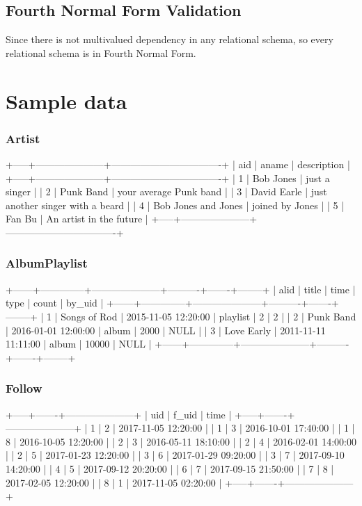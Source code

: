 \documentclass[letterpaper, 12pt]{report}
\begin{document}
	\subsection{Fourth Normal Form Validation}
	Since there is not multivalued dependency in any relational schema, so every relational schema is in Fourth Normal Form.
	
	\section{Sample data}
	\subsubsection{Artist}
	\begin{spverbatim}
		+-----+---------------------+----------------------------------+
		| aid | aname               | description                      |
		+-----+---------------------+----------------------------------+
		|   1 | Bob Jones           | just a singer                    |
		|   2 | Punk Band           | your average Punk band           |
		|   3 | David Earle         | just another singer with a beard |
		|   4 | Bob Jones and Jones | joined by Jones                  |
		|   5 | Fan Bu              | An artist in the future          |
		+-----+---------------------+----------------------------------+
	\end{spverbatim}

	\subsubsection{AlbumPlaylist}
	\begin{spverbatim}
		+------+--------------+---------------------+----------+-------+--------+
		| alid | title        | time                | type     | count | by_uid |
		+------+--------------+---------------------+----------+-------+--------+
		|    1 | Songs of Rod | 2015-11-05 12:20:00 | playlist |     2 |      2 |
		|    2 | Punk Band    | 2016-01-01 12:00:00 | album    |  2000 | NULL   |
		|    3 | Love Early   | 2011-11-11 11:11:00 | album    | 10000 | NULL   |
		+------+--------------+---------------------+----------+-------+--------+
	\end{spverbatim}

	\subsubsection{Follow}
	\begin{spverbatim}
		+-----+-------+---------------------+
		| uid | f_uid | time                |
		+-----+-------+---------------------+
		|   1 |     2 | 2017-11-05 12:20:00 |
		|   1 |     3 | 2016-10-01 17:40:00 |
		|   1 |     8 | 2016-10-05 12:20:00 |
		|   2 |     3 | 2016-05-11 18:10:00 |
		|   2 |     4 | 2016-02-01 14:00:00 |
		|   2 |     5 | 2017-01-23 12:20:00 |
		|   3 |     6 | 2017-01-29 09:20:00 |
		|   3 |     7 | 2017-09-10 14:20:00 |
		|   4 |     5 | 2017-09-12 20:20:00 |
		|   6 |     7 | 2017-09-15 21:50:00 |
		|   7 |     8 | 2017-02-05 12:20:00 |
		|   8 |     1 | 2017-11-05 02:20:00 |
		+-----+-------+---------------------+
	\end{spverbatim}
\end{document}
